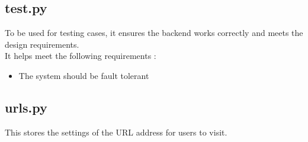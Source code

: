 \documentclass[12pt]{article}
\begin{document}
\subsection{test.py}
To be used for testing cases, it ensures the backend works correctly and meets the design requirements.\\
It helps meet the following requirements :
\begin{itemize}
	\item The system should be fault tolerant
\end{itemize} 
\subsection{urls.py}
This stores the settings of the URL address for users to visit.
\end{document}
